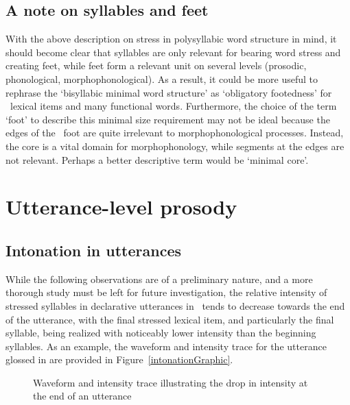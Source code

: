 \subsection{A note on syllables and feet}\label{footedness}
With the above description on stress in polysyllabic word structure in mind, it should become clear that syllables are only relevant for bearing word stress and creating feet, while feet form a relevant unit on several levels (prosodic, phonological, morphophonological). As a result, it could be more useful to rephrase the ‘bisyllabic minimal word structure’ as ‘obligatory footedness’ for \PS\ lexical items and many functional words. Furthermore, the choice of the term ‘foot’ to describe this minimal size requirement may not be ideal because the edges of the \PS\ foot are quite irrelevant to morphophonological processes. Instead, the  core is a vital domain for morphophonology, while segments at the edges are not relevant. Perhaps a better descriptive term would be ‘minimal core’.


\section{Utterance-level prosody}\label{utteranceProsody}

\subsection{Intonation in utterances}\label{utteranceIntonation}
While the following observations are of a preliminary nature, and a more thorough study must be left for future investigation, the relative intensity of stressed syllables in declarative utterances in \PS\ tends to decrease towards the end of the utterance, with the final stressed lexical item, and particularly the final syllable, being realized with noticeably lower intensity than the beginning syllables. As an example, the waveform and intensity trace for the utterance glossed in  are provided in Figure~\vref{intonationGraphic}. %
\setlength\fboxrule{0pt}
\begin{figure}[htb]
\caption{Waveform and intensity trace illustrating the drop in intensity at the end of an utterance}\label{intonationGraphic}
\end{figure}

